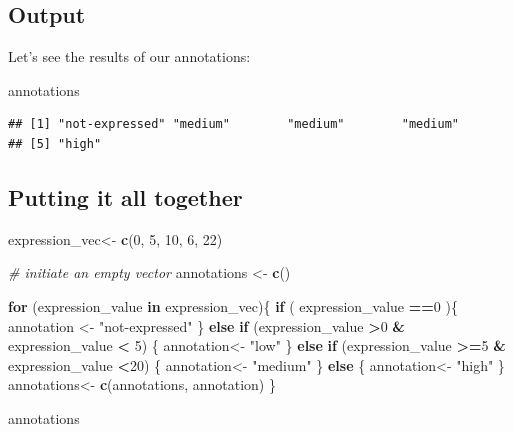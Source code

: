 \documentclass[
]{book}
\newenvironment{Shaded}{\begin{snugshade}}{\end{snugshade}}
\newcommand{\CommentTok}[1]{\textcolor[rgb]{0.56,0.35,0.01}{\textit{#1}}}
\newcommand{\ControlFlowTok}[1]{\textcolor[rgb]{0.13,0.29,0.53}{\textbf{#1}}}
\newcommand{\DecValTok}[1]{\textcolor[rgb]{0.00,0.00,0.81}{#1}}
\newcommand{\FunctionTok}[1]{\textcolor[rgb]{0.13,0.29,0.53}{\textbf{#1}}}
\newcommand{\NormalTok}[1]{#1}
\newcommand{\OtherTok}[1]{\textcolor[rgb]{0.56,0.35,0.01}{#1}}
\newcommand{\SpecialCharTok}[1]{\textcolor[rgb]{0.81,0.36,0.00}{\textbf{#1}}}
\newcommand{\StringTok}[1]{\textcolor[rgb]{0.31,0.60,0.02}{#1}}
\begin{document}
\hypertarget{output}{%
\subsection{Output}\label{output}}

Let's see the results of our annotations:

\begin{Shaded}
\begin{Highlighting}[]
\NormalTok{annotations}
\end{Highlighting}
\end{Shaded}

\begin{verbatim}
## [1] "not-expressed" "medium"        "medium"        "medium"       
## [5] "high"
\end{verbatim}

\hypertarget{putting-it-all-together}{%
\subsection{Putting it all together}\label{putting-it-all-together}}

\begin{Shaded}
\begin{Highlighting}[]
\NormalTok{expression\_vec}\OtherTok{\textless{}{-}} \FunctionTok{c}\NormalTok{(}\DecValTok{0}\NormalTok{, }\DecValTok{5}\NormalTok{, }\DecValTok{10}\NormalTok{, }\DecValTok{6}\NormalTok{, }\DecValTok{22}\NormalTok{)}

\CommentTok{\# initiate an empty vector }
\NormalTok{annotations }\OtherTok{\textless{}{-}} \FunctionTok{c}\NormalTok{() }

\ControlFlowTok{for}\NormalTok{ (expression\_value }\ControlFlowTok{in}\NormalTok{ expression\_vec)\{}
  \ControlFlowTok{if}\NormalTok{ ( expression\_value }\SpecialCharTok{==}\DecValTok{0}\NormalTok{ )\{}
\NormalTok{    annotation }\OtherTok{\textless{}{-}} \StringTok{"not{-}expressed"} 
\NormalTok{    \} }\ControlFlowTok{else} \ControlFlowTok{if}\NormalTok{ (expression\_value }\SpecialCharTok{\textgreater{}}\DecValTok{0} \SpecialCharTok{\&}\NormalTok{ expression\_value }\SpecialCharTok{\textless{}} \DecValTok{5}\NormalTok{) \{}
\NormalTok{      annotation}\OtherTok{\textless{}{-}} \StringTok{"low"}
\NormalTok{    \} }\ControlFlowTok{else} \ControlFlowTok{if}\NormalTok{ (expression\_value }\SpecialCharTok{\textgreater{}=}\DecValTok{5} \SpecialCharTok{\&}\NormalTok{ expression\_value }\SpecialCharTok{\textless{}}\DecValTok{20}\NormalTok{) \{}
\NormalTok{      annotation}\OtherTok{\textless{}{-}} \StringTok{"medium"}
\NormalTok{    \} }\ControlFlowTok{else}\NormalTok{ \{}
\NormalTok{      annotation}\OtherTok{\textless{}{-}} \StringTok{"high"}
\NormalTok{    \}}
\NormalTok{    annotations}\OtherTok{\textless{}{-}} \FunctionTok{c}\NormalTok{(annotations, annotation)}
\NormalTok{  \}}

\NormalTok{annotations}
\end{Highlighting}
\end{Shaded}
\end{document}
